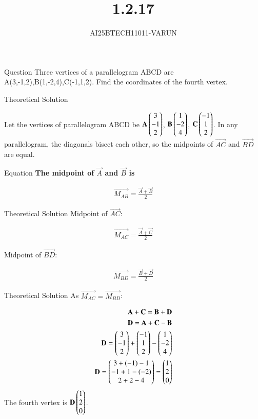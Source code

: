 \documentclass{beamer}
\title %
{1.2.17}
\author %
{AI25BTECH11011-VARUN}
\begin{document}
\frame{\titlepage}
\begin{frame}{Question}
Three vertices of a parallelogram ABCD are A(3,-1,2),B(1,-2,4),C(-1,1,2). Find the coordinates of the fourth vertex.
\end{frame}



\begin{frame}{Theoretical Solution}

Let the vertices of parallelogram ABCD be
$\Vec{A}\myvec{3\\-1\\2}$, $\Vec{ B}\myvec{1\\-2\\4}$, $\Vec{C}\myvec{-1\\1\\2}$.
In any parallelogram, the diagonals bisect each other, so the midpoints of $\vec{AC}$ and $\vec{BD}$ are equal.

\end{frame}

\begin{frame}{Equation}
\textbf{The  midpoint of $\vec{A}$ and $\vec{B}$ is}

\begin{align}
    \vec{M_{AB}} = \frac{\vec{A}+\vec{B}}{2}
\end{align}
\end{frame}


\begin{frame}{Theoretical Solution}
Midpoint of $\vec{AC}$:

\begin{align}
    \vec{M_{AC}} = \frac{\vec{A}+\vec{C}}{2}
\end{align}

Midpoint of $\vec{BD}$:

\begin{align}
    \vec{M_{BD}} = \frac{\vec{B}+\vec{D}}{2}
\end{align}
\end{frame}


\begin{frame}{Theoretical Solution}
As $\vec{M_{AC}}=\vec{M_{BD}}$:

\begin{align}
     \mathbf{A} + \mathbf{C} = \mathbf{B} + \mathbf{D}  \\
     \mathbf{D} = \mathbf{A} + \mathbf{C} - \mathbf{B}  \\
     \mathbf{D} = \begin{pmatrix}3\\-1\\2\end{pmatrix} + \begin{pmatrix}-1\\1\\2\end{pmatrix}  - \begin{pmatrix}1\\-2\\4\end{pmatrix}  \\
     \mathbf{D} = \begin{pmatrix}3+(-1)-1 \\ -1+1-(-2) \\ 2+2-4\end{pmatrix} = \begin{pmatrix}1\\2\\0\end{pmatrix}
\end{align}
The fourth vertex is $\mathbf{D}\begin{pmatrix}1\\2\\0\end{pmatrix}$.
\end{frame}
\end{document}
